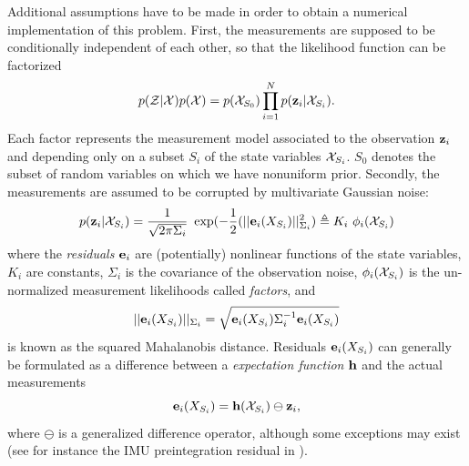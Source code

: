 Additional assumptions have to be made in order to obtain a numerical implementation of this problem.
First, the measurements are supposed to be conditionally independent of each other, so that the likelihood function can be factorized 
%
\begin{equation}
    p(\mathcal{Z} | \mathcal{X}) p(\mathcal{X}) =  p(\mathcal{X}_{S_0}) \prod_{i=1}^{N} p({\bf z}_i | \mathcal{X}_{S_i}).
\end{equation}
%
Each factor represents the measurement model associated to the  observation ${\bf z}_i$ and depending only on a subset $S_i$ of the state variables $\mathcal{X}_{S_i}$. 
$S_0$ denotes the subset of random variables on which we have nonuniform prior.
Secondly, the measurements are assumed to be corrupted by multivariate Gaussian noise:
%
\begin{equation}
    p({\bf z}_i | \mathcal{X}_{S_i}) = \frac{1}{\sqrt{2\pi\Sigma_i}} ~ \exp(- \frac{1}{2} (||{\bf e}_i(X_{S_i})||^2_{\Sigma_i}) \triangleq K_i~\phi_i(\mathcal{X}_{S_i})
\end{equation}
%
where the \textit{residuals} ${\bf e}_i$ are (potentially) nonlinear functions of the state variables, $K_i$ are constants, $\Sigma_i$ is the covariance of the observation noise,
$\phi_i(\mathcal{X}_{S_i})$ is the un-normalized measurement likelihoods called \textit{factors},
and 
%
\begin{equation*}
    ||{\bf e}_i(X_{S_i})||_{\Sigma_i} = \sqrt{{\bf e}_i(X_{S_i}) \Sigma_i^{-1} {\bf e}_i(X_{S_i})}
\end{equation*}
%
is known as the squared Mahalanobis distance. 
Residuals ${\bf e}_i(X_{S_i})$ can generally be formulated as a difference between a \textit{expectation function} ${\bf h}$ and the actual measurements
%
\begin{equation}
    {\bf e}_i(X_{S_i}) = {\bf h}(\mathcal{X}_{S_i}) \ominus {\bf z}_i,
\end{equation}
%
where $\ominus$ is a generalized difference operator,
although some exceptions may exist (see for instance the IMU preintegration residual  in ).

